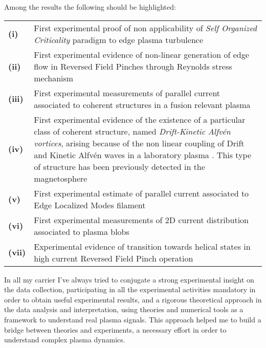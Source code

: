 {Among the results the following should be highlighted:
\begin{longtable}{@{}>{\bfseries} p{} p{}@{}}
(i) &  First experimental proof of non applicability of \emph{Self
    Organized Criticality} paradigm to edge plasma
  turbulence \parencite{Spada:2001p3574,Antoni:2001p3221} \\
(ii) &  First experimental evidence of non-linear generation of edge
  flow in Reversed Field Pinches through Reynolds stress
  mechanism \parencite{Vianello:2005p1976,Vianello:2005p2671} \\
(iii) & First experimental measurements of parallel current associated
  to coherent structures in a fusion relevant plasma \parencite{Spolaore:2009p4115} \\
(iv) & First experimental evidence of the existence of a particular 
  class of coherent structure, named \emph{Drift-Kinetic Alfv\'en
    vortices}, arising because of the non linear coupling of Drift and
  Kinetic Alfv\'en waves in a laboratory plasma \parencite{Vianello:2010p4670}. This type of structure has been
  previously detected in the magnetosphere \\
(v) &  First experimental estimate of parallel current associated to
  Edge Localized Modes filament \parencite{PhysRevLett.106.125002} \\
(vi) & First experimental measurements of 2D current distribution
associated to plasma blobs \parencite{Furno:2011cs} \\
(vii) & Experimental evidence of transition towards helical states in
high current Reversed Field Pinch
operation \parencite{Lorenzini:2009p4248} \\
\end{longtable}

In all my carrier I've always tried to conjugate a strong experimental
insight on the data collection, participating in all the experimental
activities mandatory in order to obtain useful experimental results, and a rigorous theoretical approach in
the data analysis and interpretation, using theories and numerical
tools as a framework to understand real plasma signals. This
approach helped me to build a bridge between theories and experiments,
a necessary effort in order to understand complex plasma dynamics.

\printbibliography[type=article,  title = {Cited publications}, heading=subbibliography, prefixnumbers={A}, resetnumbers=true]
}
